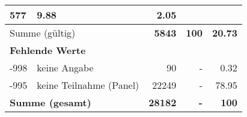 \begin{longtable}{lXrrr}
       \num{577} &
       \num[round-mode=places,round-precision=2]{9,88} &
         \num[round-mode=places,round-precision=2]{2,05} \\
     \midrule
     \multicolumn{2}{l}{Summe (gültig)} &
       \textbf{\num{5843}} &
     \textbf{100} &
       \textbf{\num[round-mode=places,round-precision=2]{20,73}} \\
     \multicolumn{5}{l}{\textbf{Fehlende Werte}}\\
       -998 &
       keine Angabe &
         \num{90} &
        - &
         \num[round-mode=places,round-precision=2]{0,32} \\
       -995 &
       keine Teilnahme (Panel) &
         \num{22249} &
        - &
         \num[round-mode=places,round-precision=2]{78,95} \\
     \midrule
     \multicolumn{2}{l}{\textbf{Summe (gesamt)}} &
          \textbf{\num{28182}} &
        \textbf{-} &
        \textbf{100} \\
     \bottomrule
     \end{longtable}
     
